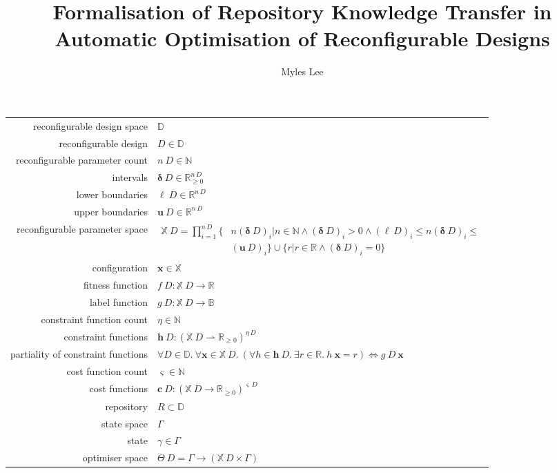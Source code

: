 \documentclass{article}
\date{}
\author{Myles Lee}
\title{Formalisation of Repository Knowledge Transfer in Automatic
	Optimisation of Reconfigurable Designs}
\begin{document}
	\maketitle
	\begin{tabularx}{\textwidth}{r X}
		reconfigurable design space & $\mathbb{D}$ \\
		reconfigurable design & $D\in\mathbb{D}$ \\
		reconfigurable parameter count & $n\ D\in\mathbb{N}$ \\
		intervals & $\boldsymbol{\delta}\ D\in\mathbb{R}_{\geqslant0}^{n\,D}$ \\
		lower boundaries & $\boldsymbol{\ell}\ D\in\mathbb{R}^{n\,D}$ \\
		upper boundaries & $\mathbf{u}\ D\in\mathbb{R}^{n\,D}$ \\
		reconfigurable parameter space & $\begin{aligned}
		\mathbb{X}\ D=\prod_{i=1}^{n\,D}\{&n(\boldsymbol{\delta}\ D)_i|n\in\mathbb{N}\land(\boldsymbol{\delta}\ D)_i>0\land(\boldsymbol{\ell}\ D)_i\leqslant n(\boldsymbol{\delta}\ D)_i\leqslant\\
		&(\mathbf{u}\ D)_i\}\cup\{r|r\in\mathbb{R}\land(\boldsymbol{\delta}\ D)_i=0\}
		\end{aligned}$ \\
		configuration & $\mathbf{x}\in\mathbb{X}$ \\
		fitness function & $f\ D:\mathbb{X}\ D\rightarrow\mathbb{R}$ \\
		label function & $g\ D:\mathbb{X}\ D\rightarrow\mathbb{B}$ \\
		constraint function count & $\eta\in\mathbb{N}$ \\
		constraint functions & $\mathbf{h}\ D:(\mathbb{X}\ D\rightharpoonup\mathbb{R}_{\geqslant0})^{\eta\,D}$ \\
		partiality of constraint functions & $\forall D\in\mathbb{D}.\ \forall\mathbf{x}\in\mathbb{X}\ D.\ (\forall h\in\mathbf{h}\ D.\ \exists r\in\mathbb{R}.\ h\ \mathbf{x}=r)\Leftrightarrow g\ D\ \mathbf{x}$ \\
		cost function count & $\varsigma\in\mathbb{N}$ \\
		cost functions & $\mathbf{c}\ D:(\mathbb{X}\ D\rightarrow\mathbb{R}_{\geqslant0})^{\varsigma\,D}$ \\
		repository & $R\subset\mathbb{D}$ \\
		state space & $\Gamma$ \\
		state & $\gamma\in\Gamma$ \\
		optimiser space & $\Theta\ D=\Gamma\rightarrow(\mathbb{X}\ D\times\Gamma)$ \\

\end{tabularx}
\end{document}

